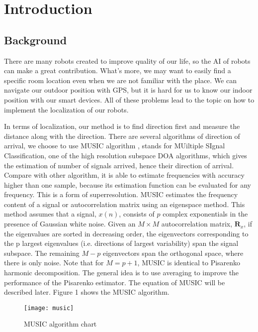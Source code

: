 \section{Introduction}
\label{sec:introduction}
\subsection{Background}
	There are many robots created to improve quality of our life, so the AI of robots can make a great contribution. What's more, we may want to easily find a specific room location even when we are not familiar with the place. We can navigate our outdoor position with GPS, but it is hard for us to know our indoor position with our smart devices. All of these problems lead to the topic on how to implement the localization of our robots.
\par
	In terms of localization, our method is to find direction first and measure the distance along with the direction. There are several algorithms of direction of arrival, we choose to use MUSIC algorithm , stands for MUiltiple SIgnal Classification, one of the high resolution subspace DOA algorithms, which gives the estimation of number of signals arrived, hence their direction of arrival. Compare with other algorithm, it is able to estimate frequencies with accuracy higher than one sample, because its estimation function can be evaluated for any frequency. This is a form of superresolution. MUSIC estimates the frequency content of a signal or autocorrelation matrix using an eigenspace method. This method assumes that a signal, $x(n)$, consists of $p$ complex exponentials in the presence of Gaussian white noise. Given an $M \times M$ autocorrelation matrix, $\mathbf{R}_x$, if the eigenvalues are sorted in decreasing order, the eigenvectors corresponding to the p largest eigenvalues (i.e. directions of largest variability) span the signal subspace. The remaining $M-p$ eigenvectors span the orthogonal space, where there is only noise. Note that for $M = p + 1$, MUSIC is identical to Pisarenko harmonic decomposition. The general idea is to use averaging to improve the performance of the Pisarenko estimator. The equation of MUSIC will be described later. Figure 1 shows the MUSIC algorithm. \cite{wiki:MUSIC} \cite{music}
	\begin{figure}[ht]
	\centering
	\texttt{[image: music]}
	\caption{MUSIC algorithm chart}
	\end{figure}
	
